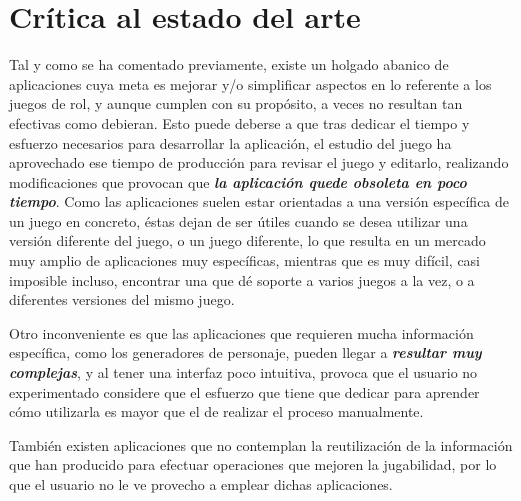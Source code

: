

\section{Crítica al estado del arte} \label{Critica_Estado_Arte}
Tal y como se ha comentado previamente, existe un holgado abanico de 
aplicaciones cuya meta es mejorar y/o simplificar aspectos en lo referente a 
los juegos de rol, y aunque cumplen con su propósito, a veces no resultan 
tan efectivas como debieran. \medskip
Esto puede deberse a que tras dedicar el tiempo y esfuerzo necesarios para 
desarrollar la aplicación, el estudio del juego ha aprovechado ese tiempo 
de producción para revisar el juego y editarlo, realizando modificaciones 
que provocan que \emph{\textbf{la aplicación quede obsoleta en poco tiempo}}. 
Como las aplicaciones suelen estar orientadas a una versión específica de un juego en concreto, 
éstas dejan de ser útiles cuando se desea utilizar una versión diferente del juego, o un juego 
diferente, lo que resulta en un mercado muy amplio de aplicaciones muy específicas, mientras que 
es muy difícil, casi imposible incluso, encontrar una que dé soporte a varios juegos a la vez, 
o a diferentes versiones del mismo juego. \medskip

Otro inconveniente es que las aplicaciones que requieren mucha información 
específica, como los generadores de personaje, pueden llegar a 
\emph{\textbf{resultar muy complejas}}, y al tener una interfaz poco intuitiva, 
provoca que el usuario no experimentado considere que el esfuerzo que tiene que 
dedicar para aprender cómo utilizarla es mayor que el de realizar el proceso manualmente. \medskip

También existen aplicaciones que no contemplan la reutilización de la 
información que han producido para efectuar operaciones que mejoren 
la jugabilidad, por lo que el usuario no le ve provecho a emplear dichas
aplicaciones.